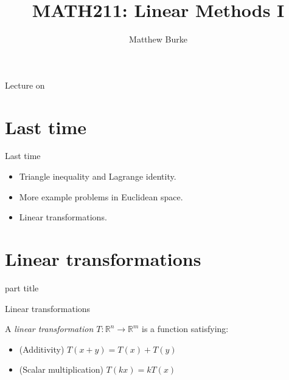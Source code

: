 \documentclass{beamer}
\title{MATH211: Linear Methods I}
\author{Matthew Burke}
\date{\lectureDate}
\newcommand{\lectureDate}{\formatdate{30}{10}{2018}}
\begin{document}
\frame{\titlepage}

\begin{frame}{Lecture on \lectureDate}
  \tableofcontents
\end{frame}

\section*{Last time}
\label{sec:Last-time}

\begin{frame}{Last time}
  \begin{itemize}
  \item	Triangle inequality and Lagrange identity.\vfill
  \item More example problems in Euclidean space.\vfill
  \item Linear transformations.
  \end{itemize}
\end{frame}

\section{Linear transformations}

\begin{frame}
\begin{beamercolorbox}[sep=12pt,center]{part title}
\insertsection\par
\end{beamercolorbox}
\end{frame}

\begin{frame}{Linear transformations}
\begin{definition}
A \emph{linear transformation $T:\mathbb{R}^n \rightarrow \mathbb{R}^m$} is a function satisfying:
\begin{itemize}
	\item (Additivity) $T(x+y) = T(x) + T(y)$
	\item (Scalar multiplication) $T(kx) = kT(x)$
\end{itemize}
\end{definition}
\end{frame}
\end{document}
